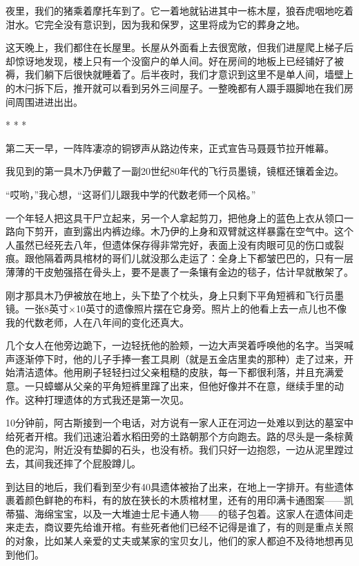 \documentclass[12pt,oneside]{book}
\begin{document}
\begin{bookref}[frametitle={\cite{好好告别}}]
夜里，我们的猪乘着摩托车到了。它一着地就钻进其中一栋木屋，狼吞虎咽地吃着泔水。它完全没有意识到，因为我和保罗，这里将成为它的葬身之地。

这天晚上，我们都住在长屋里。长屋从外面看上去很宽敞，但我们进屋爬上梯子后却惊讶地发现，楼上只有一个没窗户的单人间。好在房间的地板上已经铺好了被褥，我们躺下后很快就睡着了。后半夜时，我们才意识到这里不是单人间，墙壁上的木闩拆下后，推开就可以看到另外三间屋子。一整晚都有人蹑手蹑脚地在我们房间周围进进出出。

\begin{center}
* * *
\end{center}

第二天一早，一阵阵凄凉的铜锣声从路边传来，正式宣告马聂聂节拉开帷幕。

我见到的第一具木乃伊戴了一副20世纪80年代的飞行员墨镜，镜框还镶着金边。

“哎哟，”我心想，“这哥们儿跟我中学的代数老师一个风格。”

一个年轻人把这具干尸立起来，另一个人拿起剪刀，把他身上的蓝色上衣从领口一路向下剪开，直到露出内裤边缘。木乃伊的上身和双臂就这样暴露在空气中。这个人虽然已经死去八年，但遗体保存得非常完好，表面上没有肉眼可见的伤口或裂痕。跟他隔着两具棺材的哥们儿就没那么走运了：全身上下都皱巴巴的，只有一层薄薄的干皮勉强搭在骨头上，要不是裹了一条镶有金边的毯子，估计早就散架了。

刚才那具木乃伊被放在地上，头下垫了个枕头，身上只剩下平角短裤和飞行员墨镜。一张8英寸×10英寸的遗像照片摆在它身旁。照片上的他看上去一点儿也不像我的代数老师，人在八年间的变化还真大。

几个女人在他旁边跪下，一边轻抚他的脸颊，一边大声哭着呼唤他的名字。当哭喊声逐渐停下时，他的儿子手捧一套工具刷（就是五金店里卖的那种）走了过来，开始清洁遗体。他用刷子轻轻扫过父亲粗糙的皮肤，每一下都很利落，并且充满爱意。一只蟑螂从父亲的平角短裤里蹿了出来，但他好像并不在意，继续手里的动作。这种打理遗体的方式我还是第一次见。

10分钟前，阿古斯接到一个电话，对方说有一家人正在河边一处难以到达的墓室中给死者开棺。我们迅速沿着水稻田旁的土路朝那个方向跑去。路的尽头是一条棕黄色的泥沟，附近没有垫脚的石头，也没有桥。我们只好一边抱怨，一边从泥里蹚过去，其间我还摔了个屁股蹲儿。

到达目的地后，我们看到至少有40具遗体被抬了出来，在地上一字排开。有些遗体裹着颜色鲜艳的布料，有的放在狭长的木质棺材里，还有的用印满卡通图案——凯蒂猫、海绵宝宝，以及一大堆迪士尼卡通人物——的毯子包着。这家人在遗体间走来走去，商议要先给谁开棺。有些死者他们已经不记得是谁了，有的则是重点关照的对象，比如某人亲爱的丈夫或某家的宝贝女儿，他们的家人都迫不及待地想再见到他们。


\end{bookref}
\end{document}
